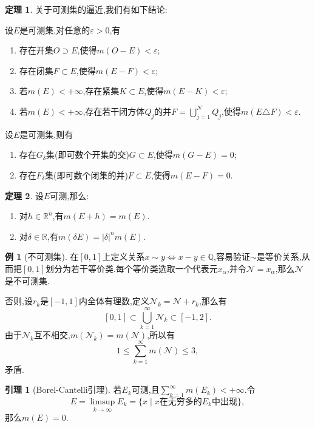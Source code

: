 \documentclass{ctexart}
\theoremstyle{definition}
\newtheorem{lemma}{引理}
\newtheorem{theorem}{定理}
\newtheorem{example}{例}
\theoremstyle{remark}
\begin{document}
	\begin{theorem}\label{thm_cube_union}
		关于可测集的逼近,我们有如下结论:
		
		设$E$是可测集,对任意的$\varepsilon>0$,有
		\begin{enumerate}
			\item 存在开集$O\supset E$,使得$m(O-E)<\varepsilon$;
			\item 存在闭集$F\subset E$,使得$m(E-F)<\varepsilon$;
			\item 若$m(E)<+\infty$,存在紧集$K\subset E$,使得$m(E-K)<\varepsilon$;
			\item \label{item_cube_union} 若$m(E)<+\infty$,存在若干闭方体$Q_j$的并$F=\bigcup_{j=1}^N{Q_j}$,使得$m(E\triangle F)<\varepsilon$.
		\end{enumerate}
		
		设$E$是可测集,则有
		\begin{enumerate}[start=5]
			\item 存在$G_\delta$集(即可数个开集的交)$G\subset E$,使得$m(G-E)=0$;
			\item 存在$F_\delta$集(即可数个闭集的并)$F\subset E$,使得$m(E-F)=0$.
		\end{enumerate}
	\end{theorem}
	
	\begin{theorem}
		设$E$可测,那么:
		\begin{enumerate}
			\item 对$h\in\mathbb{R}^n$,有$m(E+h)=m(E)$.
			\item 对$\delta\in\mathbb{R}$,有$m(\delta E)=|\delta|^nm(E)$.
		\end{enumerate}
	\end{theorem}
	
	\begin{example}[不可测集]
		在$[0,1]$上定义关系$x\sim y\Leftrightarrow x-y\in\mathbb{Q}$,容易验证$\sim$是等价关系,从而把$[0,1]$划分为若干等价类.每个等价类选取一个代表元$x_\alpha$,并令$\mathcal{N}={x_\alpha}$,那么$\mathcal{N}$是不可测集.
		
		否则,设$r_k$是$[-1,1]$内全体有理数,定义$\mathcal{N}_k=\mathcal{N}+r_k$,那么有
		$$[0,1]\subset\bigcup_{k=1}^\infty{\mathcal{N}_k}\subset[-1,2].$$
		由于$\mathcal{N}_k$互不相交,$m(\mathcal{N}_k)=m(\mathcal{N})$,所以有
		$$1\le\sum_{k=1}^\infty{m(\mathcal{N})}\le3,$$
		矛盾.
	\end{example}
	
	\begin{lemma}[Borel-Cantelli引理]
		若$E_k$可测,且$\sum_{k=1}^\infty{m(E_k)}<+\infty$.令
		$$E=\limsup_{k\to\infty}{E_k}=\{x\mid x\mbox{在无穷多的}E_k\mbox{中出现}\},$$
		那么$m(E)=0$.
	\end{lemma}
	
\end{document}
